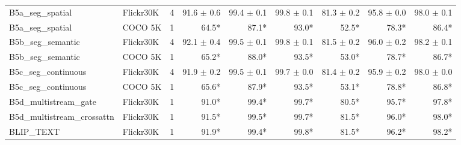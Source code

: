 \begin{tabular}{llrrrrrrr}
B5a\_seg\_spatial & Flickr30K & 4 & 91.6 $\pm$ 0.6 & 99.4 $\pm$ 0.1 & 99.8 $\pm$ 0.1 & 81.3 $\pm$ 0.2 & 95.8 $\pm$ 0.0 & 98.0 $\pm$ 0.1 \\
B5a\_seg\_spatial & COCO 5K & 1 & 64.5* & 87.1* & 93.0* & 52.5* & 78.3* & 86.4* \\
B5b\_seg\_semantic & Flickr30K & 4 & 92.1 $\pm$ 0.4 & 99.5 $\pm$ 0.1 & 99.8 $\pm$ 0.1 & 81.5 $\pm$ 0.2 & 96.0 $\pm$ 0.2 & 98.2 $\pm$ 0.1 \\
B5b\_seg\_semantic & COCO 5K & 1 & 65.2* & 88.0* & 93.5* & 53.0* & 78.7* & 86.7* \\
B5c\_seg\_continuous & Flickr30K & 4 & 91.9 $\pm$ 0.2 & 99.5 $\pm$ 0.1 & 99.7 $\pm$ 0.0 & 81.4 $\pm$ 0.2 & 95.9 $\pm$ 0.2 & 98.0 $\pm$ 0.0 \\
B5c\_seg\_continuous & COCO 5K & 1 & 65.6* & 87.9* & 93.5* & 53.1* & 78.8* & 86.8* \\
B5d\_multistream\_gate & Flickr30K & 1 & 91.0* & 99.4* & 99.7* & 80.5* & 95.7* & 97.8* \\
B5d\_multistream\_crossattn & Flickr30K & 1 & 91.5* & 99.5* & 99.7* & 81.5* & 96.0* & 98.0* \\
BLIP\_TEXT & Flickr30K & 1 & 91.9* & 99.4* & 99.8* & 81.5* & 96.2* & 98.2* \\
\bottomrule
\end{tabular}

